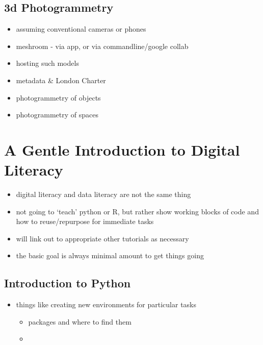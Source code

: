 \documentclass[
]{book}
\providecommand{\tightlist}{%
  \setlength{\itemsep}{0pt}\setlength{\parskip}{0pt}}
\begin{document}
\hypertarget{photogrammetry}{%
\section{3d Photogrammetry}\label{photogrammetry}}

\begin{itemize}
\tightlist
\item
  assuming conventional cameras or phones
\item
  meshroom - via app, or via commandline/google collab
\item
  hosting such models
\item
  metadata \& London Charter
\item
  photogrammetry of objects
\item
  photogrammetry of spaces
\end{itemize}

\hypertarget{digital-literacy}{%
\chapter{A Gentle Introduction to Digital Literacy}\label{digital-literacy}}

\begin{itemize}
\tightlist
\item
  digital literacy and data literacy are not the same thing
\item
  not going to `teach' python or R, but rather show working blocks of code and how to reuse/repurpose for immediate tasks
\item
  will link out to appropriate other tutorials as necessary
\item
  the basic goal is always minimal amount to get things going
\end{itemize}

\hypertarget{introduction-to-python}{%
\section{Introduction to Python}\label{introduction-to-python}}

\begin{itemize}
\tightlist
\item
  things like creating new environments for particular tasks

  \begin{itemize}
  \tightlist
  \item
    packages and where to find them
  \item
  \end{itemize}
\end{itemize}
\end{document}
